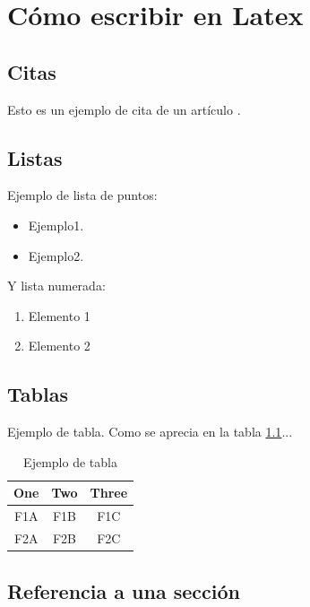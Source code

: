 \chapter{Cómo escribir en Latex}

\section{Citas}


Esto es un ejemplo de cita de un artículo \cite{Brunete:2013}.


\section{Listas}

Ejemplo de lista de puntos:
\begin{itemize}
\item Ejemplo1.
\item Ejemplo2.
\end{itemize} 

Y lista numerada:
\begin{enumerate}
\item Elemento 1
\item Elemento 2
\end{enumerate}

\section{Tablas}

Ejemplo de tabla. Como se aprecia en la tabla \ref{tab:table_example}...
\begin{table}[tb]
\caption{Ejemplo de tabla}
\label{tab:table_example}
\begin{center}
\begin{tabular}{|c||c|c|}
\hline
One & Two & Three\\
\hline
F1A & F1B & F1C\\
F2A & F2B & F2C\\
\hline
\end{tabular}
\end{center}
\end{table}

\section{Referencia a una sección}
\label{sec:refsec}

